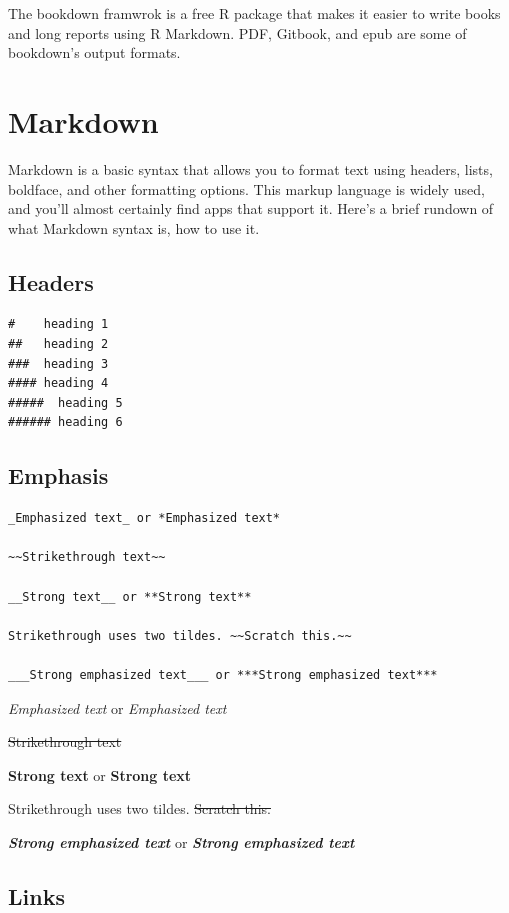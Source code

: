 \documentclass[
]{book}
\begin{document}
The bookdown framwrok is a free R package that makes it easier to write books and long reports using R Markdown. PDF, Gitbook, and epub are some of bookdown's output formats.

\hypertarget{markdown}{%
\chapter{Markdown}\label{markdown}}

Markdown is a basic syntax that allows you to format text using headers, lists, boldface, and other formatting options. This markup language is widely used, and you'll almost certainly find apps that support it. Here's a brief rundown of what Markdown syntax is, how to use it.

\hypertarget{headers}{%
\section{Headers}\label{headers}}

\begin{verbatim}
#    heading 1 
##   heading 2 
###  heading 3 
#### heading 4
#####  heading 5 
###### heading 6
\end{verbatim}

\hypertarget{emphasis}{%
\section{Emphasis}\label{emphasis}}

\begin{verbatim}
_Emphasized text_ or *Emphasized text*

~~Strikethrough text~~

__Strong text__ or **Strong text**

Strikethrough uses two tildes. ~~Scratch this.~~

___Strong emphasized text___ or ***Strong emphasized text***
\end{verbatim}

\emph{Emphasized text} or \emph{Emphasized text}

\sout{Strikethrough text}

\textbf{Strong text} or \textbf{Strong text}

Strikethrough uses two tildes. \sout{Scratch this.}

\textbf{\emph{Strong emphasized text}} or \textbf{\emph{Strong emphasized text}}

\hypertarget{links}{%
\section{Links}\label{links}}
\end{document}
